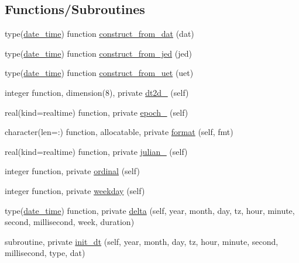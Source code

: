 \subsection*{Functions/\+Subroutines}
\begin{DoxyCompactItemize}
\item 
type(\mbox{\hyperlink{structm__time__oop_1_1date__time}{date\+\_\+time}}) function \mbox{\hyperlink{namespacem__time__oop_ae43c4146d74863b5aee027ebc0103f48}{construct\+\_\+from\+\_\+dat}} (dat)
\item 
type(\mbox{\hyperlink{structm__time__oop_1_1date__time}{date\+\_\+time}}) function \mbox{\hyperlink{namespacem__time__oop_ac7d9aa1885c2b8df613541be8a147064}{construct\+\_\+from\+\_\+jed}} (jed)
\item 
type(\mbox{\hyperlink{structm__time__oop_1_1date__time}{date\+\_\+time}}) function \mbox{\hyperlink{namespacem__time__oop_ae952d7599526f1b2632452d00363add3}{construct\+\_\+from\+\_\+uet}} (uet)
\item 
integer function, dimension(8), private \mbox{\hyperlink{namespacem__time__oop_a93bafde872994fe68136d83195400e11}{dt2d\+\_\+}} (self)
\item 
real(kind=realtime) function, private \mbox{\hyperlink{namespacem__time__oop_ab4cc90bb587c2d3c2819bffc8f92cb59}{epoch\+\_\+}} (self)
\item 
character(len=\+:) function, allocatable, private \mbox{\hyperlink{namespacem__time__oop_a78bb598e3481faa48df9733a3f9ae060}{format}} (self, fmt)
\item 
real(kind=realtime) function, private \mbox{\hyperlink{namespacem__time__oop_a85c4d4edaa644bf22f68ffd724de036a}{julian\+\_\+}} (self)
\item 
integer function, private \mbox{\hyperlink{namespacem__time__oop_a7845f6da505dff53007df45b5c198081}{ordinal}} (self)
\item 
integer function, private \mbox{\hyperlink{namespacem__time__oop_ad290beea1dd0dc3d34486e8b4cd8a86c}{weekday}} (self)
\item 
type(\mbox{\hyperlink{structm__time__oop_1_1date__time}{date\+\_\+time}}) function, private \mbox{\hyperlink{namespacem__time__oop_aecd1edc1f6ca447d5381c8092eba7924}{delta}} (self, year, month, day, tz, hour, minute, second, millisecond, week, duration)
\item 
subroutine, private \mbox{\hyperlink{namespacem__time__oop_ac81ff1eb27f637a60530d3c5d442fc71}{init\+\_\+dt}} (self, year, month, day, tz, hour, minute, second, millisecond, type, dat)
\item 

\end{DoxyCompactItemize}
